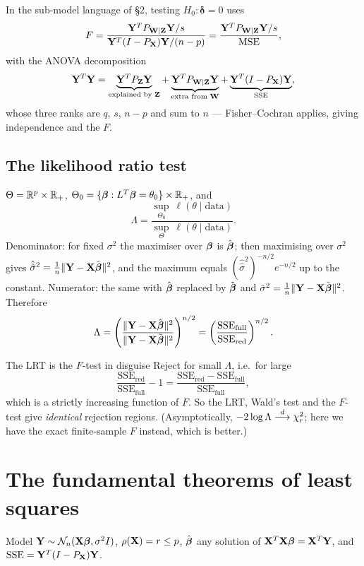 \documentclass[11pt]{article}
\begin{document}
In the sub-model language of \S2, testing $H_0:\boldsymbol\delta=0$ uses
\[
  F=\frac{\mathbf{Y}^TP_{\mathbf{W}\mid\mathbf{Z}}\mathbf{Y}/s}{\mathbf{Y}^T(I-P_{\mathbf{X}})\mathbf{Y}/(n-p)}=\frac{\mathbf{Y}^TP_{\mathbf{W}\mid\mathbf{Z}}\mathbf{Y}/s}{\mathrm{MSE}},
\]
with the ANOVA decomposition
\[
  \mathbf{Y}^T\mathbf{Y}=\underbrace{\mathbf{Y}^TP_{\mathbf{Z}}\mathbf{Y}}_{\text{explained by }\mathbf{Z}}
          +\underbrace{\mathbf{Y}^TP_{\mathbf{W}\mid\mathbf{Z}}\mathbf{Y}}_{\text{extra from }\mathbf{W}}
          +\underbrace{\mathbf{Y}^T(I-P_{\mathbf{X}})\mathbf{Y}}_{\mathrm{SSE}} ,
\]
whose three ranks are $q$, $s$, $n-p$ and sum to $n$ --- Fisher--Cochran applies, giving
independence and the $F$.

\subsection{The likelihood ratio test}

$\Theta=\mathbb{R}^p\times\mathbb{R}_+$, $\Theta_0=\{\boldsymbol{\beta}:L^T\boldsymbol{\beta}=\theta_0\}\times\mathbb{R}_+$, and
\[
  \Lambda=\frac{\sup_{\Theta_0}\ \ell(\theta\mid\text{data})}{\sup_{\Theta}\ \ell(\theta\mid\text{data})} .
\]
Denominator: for fixed $\sigma^2$ the maximiser over $\boldsymbol{\beta}$ is $\hat{\boldsymbol{\beta}}$; then maximising over
$\sigma^2$ gives $\hat{\hat\sigma}^2=\tfrac1n\|\mathbf{Y}-\mathbf{X}\hat{\boldsymbol{\beta}}\|^2$, and the maximum equals
$(\hat{\hat\sigma}^2)^{-n/2}e^{-n/2}$ up to the constant. Numerator: the same with $\hat{\boldsymbol{\beta}}$
replaced by $\tilde{\boldsymbol{\beta}}$ and $\tilde\sigma^2=\tfrac1n\|\mathbf{Y}-\mathbf{X}\tilde{\boldsymbol{\beta}}\|^2$. Therefore
\[
  \Lambda=\left(\frac{\|\mathbf{Y}-\mathbf{X}\hat{\boldsymbol{\beta}}\|^2}{\|\mathbf{Y}-\mathbf{X}\tilde{\boldsymbol{\beta}}\|^2}\right)^{n/2}
        =\left(\frac{\mathrm{SSE}_{\text{full}}}{\mathrm{SSE}_{\text{red}}}\right)^{n/2}.
\]

\begin{idea}{The LRT is the $F$-test in disguise}
Reject for small $\Lambda$, i.e.\ for large
\[
  \frac{\mathrm{SSE}_{\text{red}}}{\mathrm{SSE}_{\text{full}}}-1
  =\frac{\mathrm{SSE}_{\text{red}}-\mathrm{SSE}_{\text{full}}}{\mathrm{SSE}_{\text{full}}} ,
\]
which is a strictly increasing function of $F$. So the LRT, Wald's test and the $F$-test give
\emph{identical} rejection regions. (Asymptotically, $-2\log\Lambda\overset{d}{\longrightarrow}\chi^2_r$; here we
have the exact finite-sample $F$ instead, which is better.)
\end{idea}

\section{The fundamental theorems of least squares}

Model $\mathbf{Y}\sim\mathcal{N}_n(\mathbf{X}\boldsymbol{\beta},\sigma^2I)$, $\rho(\mathbf{X})=r\le p$, $\hat{\boldsymbol{\beta}}$ any solution of
$\mathbf{X}^T\mathbf{X}\boldsymbol{\beta}=\mathbf{X}^T\mathbf{Y}$, and $\mathrm{SSE}=\mathbf{Y}^T(I-P_{\mathbf{X}})\mathbf{Y}$.
\end{document}
